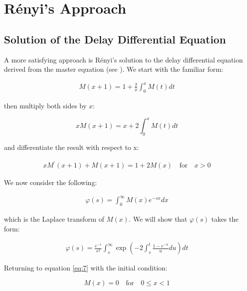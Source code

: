 
\chapter{R\'enyi's Approach}











\section{Solution of the Delay Differential Equation}

A more satisfying approach is R\'enyi's solution to the delay differential equation derived 
from the master equation (see \cite{yoshiaki2011random}). We start with the familiar form: \bigskip

\begin{eqnarray} \label{eq:0}
	M(x + 1) = 1 + \frac{2}{x} \int_{0}^{x} M(t) dt
\end{eqnarray}\medskip

then multiply both sides by $x$: \bigskip

\[
	x M(x + 1) = x + 2 \int_{0}^{x} M(t) dt
\]\medskip

and differentiate the result with respect to x: \bigskip

\begin{eqnarray} \label{eq:7}
	x M^{\prime}(x + 1) + M(x + 1) = 1 + 2 M(x) \quad \text{for} \quad x > 0
\end{eqnarray}\medskip

We now consider the following: \bigskip

\begin{eqnarray} \label{eq:8}
	\varphi(s) = \int_{0}^{\infty} M(x) e^{-sx} dx
\end{eqnarray}\medskip

which is the Laplace transform of $M(x)$. We will show that $\varphi(s)$ takes the form: \bigskip

\begin{eqnarray} \label{eq:9}
	\varphi(s) = \frac{e^{-s}}{s^2} \int_{s}^{\infty} \exp \left( -2 \int_{s}^{t} \frac{1 - e^{-u}}{u} du \right) dt
\end{eqnarray}\medskip

Returning to equation \ref{eq:7} with the initial condition: \bigskip

\[
	M(x) = 0 \quad \text{for} \quad 0 \leq x < 1
\]\medskip

